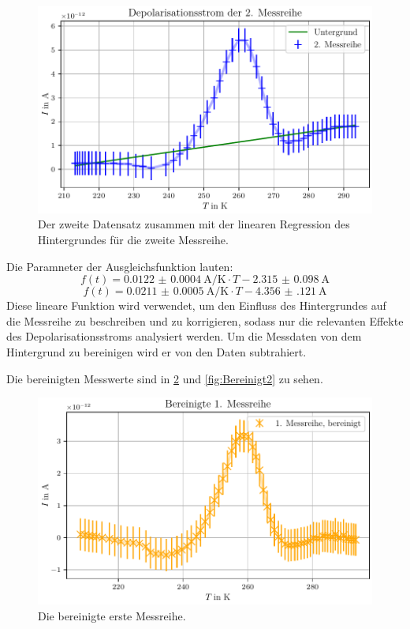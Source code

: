 \begin{figure}[H]
    \centering
    \includegraphics[width=\textwidth]{plots/C_messreihe2.pdf}
    \caption{Der zweite Datensatz zusammen mit der linearen Regression des Hintergrundes für die zweite Messreihe.}
    \label{fig:Hintergrund2}
\end{figure}

Die Paramneter der Ausgleichsfunktion lauten:
\begin{equation}
f(t) = \qty{0.0122(4)}{\ampere\per\kelvin} \cdot T - \qty{2.315(98)}{\ampere}
\end{equation}
\begin{equation}
f(t) = \qty{0.0211(5)}{\ampere\per\kelvin} \cdot T - \qty{4.356(121)}{\ampere}
\end{equation}
Diese lineare Funktion wird verwendet, um den Einfluss des Hintergrundes auf die Messreihe zu beschreiben und zu korrigieren,
sodass nur die relevanten Effekte des Depolarisationsstroms analysiert werden. Um die Messdaten von dem 
Hintergrund zu bereinigen wird er von den Daten subtrahiert.

Die bereinigten Messwerte sind in \ref{fig:Bereinigt1} und \ref{fig:Bereinigt2}  zu sehen.

\begin{figure}[H]
    \centering
    \includegraphics[width=\textwidth]{plots/D_messreihe1_bereinigt.pdf}
    \caption{Die bereinigte erste Messreihe.}
    \label{fig:Bereinigt1}
\end{figure}

